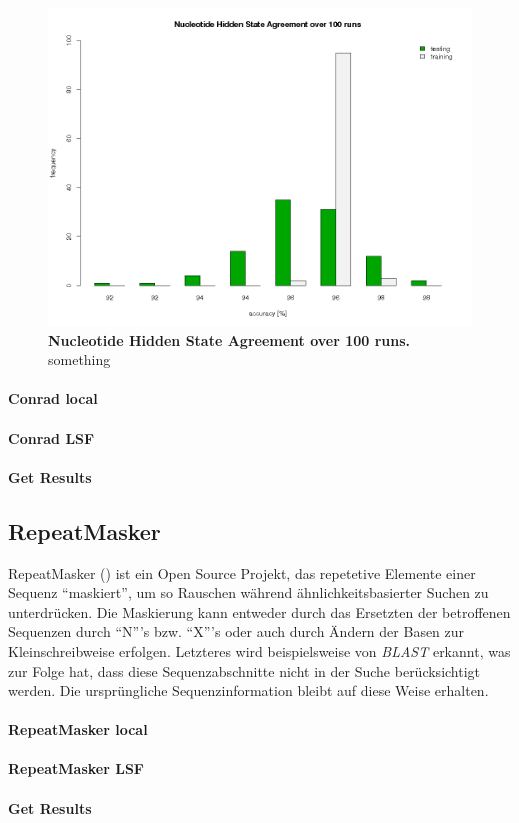 \begin{figure}[ht]
	\begin{center}
		\includegraphics[scale=0.42]{pics/agree2.png}
	\caption[Nucleotide Hidden State Agreement over 100 runs]{
	\textbf{Nucleotide Hidden State Agreement over 100 runs.}
	something}
	\end{center}
	\label{fig:agree2}
\end{figure}

\paragraph{Conrad local}

\paragraph{Conrad LSF}

\paragraph{Get Results}

\subsection{RepeatMasker}
RepeatMasker
()
ist ein Open Source Projekt, das repetetive Elemente einer Sequenz
\enquote{maskiert}, um so Rauschen während ähnlichkeitsbasierter Suchen zu
unterdrücken.
Die Maskierung kann entweder durch das Ersetzten der betroffenen Sequenzen
durch \enquote{N}'s bzw. \enquote{X}'s oder auch durch Ändern der Basen zur
Kleinschreibweise erfolgen.
Letzteres wird beispielsweise von \textit{BLAST} erkannt, was zur Folge hat,
dass diese Sequenzabschnitte nicht in der Suche berücksichtigt werden.
Die ursprüngliche Sequenzinformation bleibt auf diese Weise	erhalten.

\paragraph{RepeatMasker local}

\paragraph{RepeatMasker LSF}

\paragraph{Get Results}


